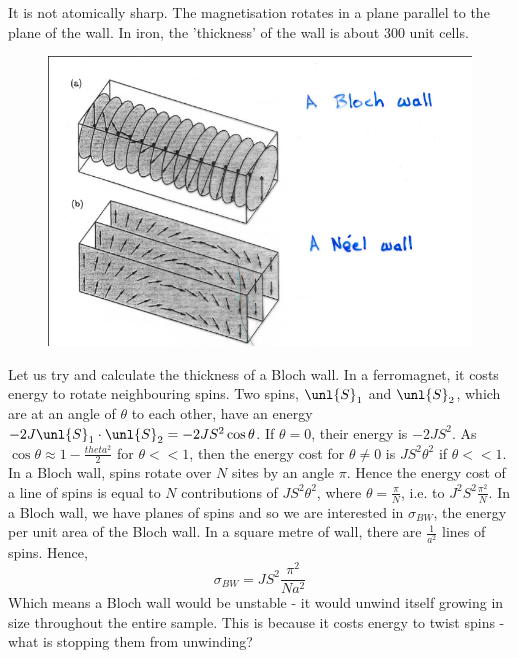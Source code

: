 \documentclass[a4paper, 11pt, normalem]{report}
\begin{document}
It is not atomically sharp. 
The magnetisation rotates in a plane parallel to the plane of the wall. 
In iron, the 'thickness' of the wall is about 300 unit cells.
\begin{figure}[H]
    \centering
    \includegraphics[scale=0.5]{walls.png}
\end{figure}
Let us try and calculate the thickness of a Bloch wall. 
In a ferromagnet, it costs energy to rotate neighbouring spins. 
Two spins, $\unl{S}_1$ and $\unl{S}_2$, which are at an angle of $\theta$ to each other, have an energy $-2J\unl{S}_1\cdot\unl{S}_2 = -2JS^2\cos\theta$. 
If $\theta=0$, their energy is $-2JS^2$.
As $\cos\theta \approx 1-\frac{theta^2}{2}$ for $\theta << 1$, then the energy cost for $\theta\neq0$ is $JS^2\theta^2$ if $\theta<<1$.
In a Bloch wall, spins rotate over $N$ sites by an angle $\pi$. 
Hence the energy cost of a line of spins is equal to $N$ contributions of $JS^2\theta^2$, where $\theta=\frac{\pi}{N}$, i.e. to $J^2S^2\frac{\pi^2}{N}$.
In a Bloch wall, we have planes of spins and so we are interested in $\sigma_{BW}$, the energy per unit area of the Bloch wall. 
In a square metre of wall, there are $\frac{1}{a^2}$ lines of spins. 
Hence,
\begin{equation}
    \sigma_{BW} = JS^2\frac{\pi^2}{Na^2}
\end{equation}
Which means a Bloch wall would be unstable - it would unwind itself growing in size throughout the entire sample. 
This is because it costs energy to twist spins - what is stopping them from unwinding?
\end{document}
